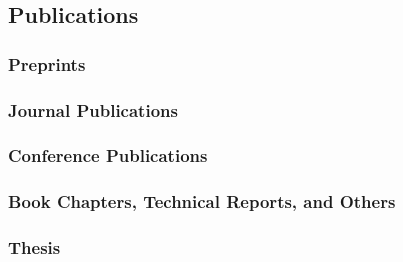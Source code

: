 \subsection*{Publications}
\subsubsection*{Preprints}
\renewcommand*{\labelenumi}{[P\theenumi]}
\subsubsection*{Journal Publications}
\renewcommand*{\labelenumi}{[J\theenumi]}
\subsubsection*{Conference Publications}
\renewcommand*{\labelenumi}{[C\theenumi]}
\subsubsection*{Book Chapters, Technical Reports, and Others}
\renewcommand*{\labelenumi}{[B\theenumi]}
\subsubsection*{Thesis}
\renewcommand*{\labelenumi}{[T\theenumi]}
